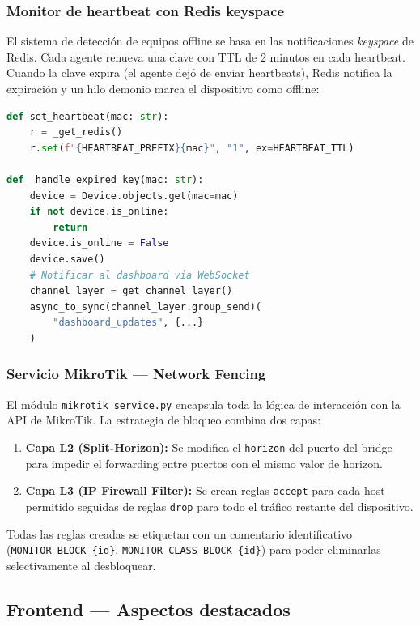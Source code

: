 \documentclass[12pt, a4paper, twoside]{article}
\begin{document}
\subsubsection{Monitor de heartbeat con Redis keyspace}

El sistema de detección de equipos offline se basa en las notificaciones \textit{keyspace} de Redis. Cada agente renueva una clave con TTL de 2 minutos en cada heartbeat. Cuando la clave expira (el agente dejó de enviar heartbeats), Redis notifica la expiración y un hilo demonio marca el dispositivo como offline:

\begin{lstlisting}[language=Python, caption={Fragmento del monitor de heartbeat.}]
def set_heartbeat(mac: str):
    r = _get_redis()
    r.set(f"{HEARTBEAT_PREFIX}{mac}", "1", ex=HEARTBEAT_TTL)

def _handle_expired_key(mac: str):
    device = Device.objects.get(mac=mac)
    if not device.is_online:
        return
    device.is_online = False
    device.save()
    # Notificar al dashboard via WebSocket
    channel_layer = get_channel_layer()
    async_to_sync(channel_layer.group_send)(
        "dashboard_updates", {...}
    )
\end{lstlisting}

\subsubsection{Servicio MikroTik — Network Fencing}

El módulo \texttt{mikrotik\_service.py} encapsula toda la lógica de interacción con la API de MikroTik. La estrategia de bloqueo combina dos capas:

\begin{enumerate}
  \item \textbf{Capa L2 (Split-Horizon):} Se modifica el \texttt{horizon} del puerto del bridge para impedir el forwarding entre puertos con el mismo valor de horizon.
  \item \textbf{Capa L3 (IP Firewall Filter):} Se crean reglas \texttt{accept} para cada host permitido seguidas de reglas \texttt{drop} para todo el tráfico restante del dispositivo.
\end{enumerate}

Todas las reglas creadas se etiquetan con un comentario identificativo (\texttt{MONITOR\_BLOCK\_\{id\}}, \texttt{MONITOR\_CLASS\_BLOCK\_\{id\}}) para poder eliminarlas selectivamente al desbloquear.

\subsection{Frontend — Aspectos destacados}
\end{document}
